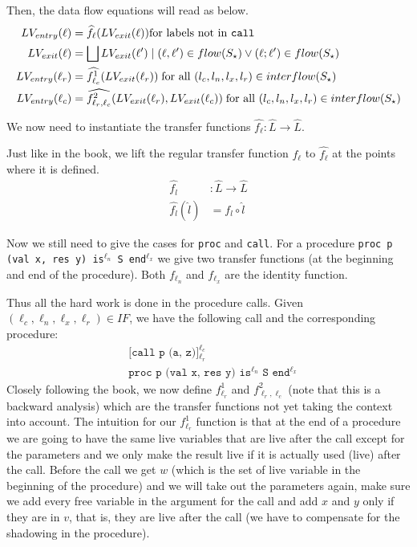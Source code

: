 \documentclass[a4wide,12pt]{article}
\theoremstyle{definition}
\theoremstyle{plain}
\theoremstyle{remark}
\begin{document}
Then, the data flow equations will read as below.
\begin{align*}
LV_{entry}(\ell) & = \widehat{f_\ell}(LV_{exit}(\ell)) \text{for labels not in \texttt{call}}\\
LV_{exit}(\ell) &= \bigsqcup{LV_{exit}(\ell') \mid (\ell,\ell') \in flow(S_\star) \lor (\ell;\ell') \in flow(S_\star)}\\
LV_{entry}(\ell_r) &= \widehat{f^1_{\ell_c}}(LV_{exit}(\ell_r)) \text{\;for all $(l_c,l_n,l_x,l_r) \in interflow(S_\star)$}\\
LV_{entry}(\ell_c) &= \widehat{f^2_{\ell_r,\ell_c}}(LV_{exit}(\ell_r),LV_{exit}(\ell_c)) \text{\;for all $(l_c,l_n,l_x,l_r) \in interflow(S_\star)$}\\
\end{align*}

We now need to instantiate the transfer functions $\widehat{f_\ell} : \hat{L} \to \hat{L}$.

Just like in the book, we lift the regular transfer function $f_\ell$ to $\widehat{f_\ell}$ at the points
where it is defined.
\begin{align*}
\widehat{f_l} & : \widehat{L} \to \widehat {L} \\
\widehat{f_l} (\widehat{l}) & = f_l \circ \widehat{l}
\end{align*}

Now we still need to give the cases for \texttt{proc} and \texttt{call}. For
a procedure
\texttt{proc p (val x, res y) is$^{\ell_n}$ S end$^{\ell_x}$}
we give two transfer functions (at the beginning and end of the procedure).
Both $f_{\ell_n}$ and $f_{\ell_x}$ are the identity function.

Thus all the hard work is
done in the procedure calls.
Given $(\ell_c, \ell_n, \ell_x, \ell_r) \in IF$, we have the following call and the corresponding
procedure:
\begin{align*}
& \texttt{[call p (a, z)]$^{\ell_c}_{\ell_r}$} \\
& \texttt{proc p (val x, res y) is$^{\ell_n}$ S end$^{\ell_x}$}
\end{align*}
Closely following the book, we now define $f^1_{\ell_r}$ and $f^2_{\ell_r,\ell_c}$ (note that
this is a backward analysis) which are the transfer functions not yet taking the context into account.  
The intuition for our $f^1_{\ell_r}$ function is that at the end of a procedure we are going
to have the same live variables that are live after the call except for the parameters and we only make the result
live if it is actually used (live) after the call. Before the call we get $w$ (which is the set of live variable 
in the beginning of the procedure) and we will
take out the parameters again, make sure we add every free variable in the
argument for the call and add $x$ and $y$ only if they are in $v$, that is, they are live after the call
(we have to compensate for the shadowing in the procedure).
 
\end{document}
